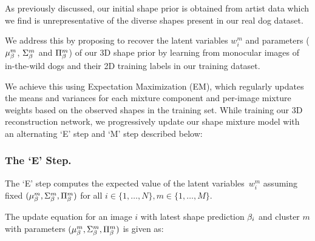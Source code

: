 As previously discussed, our initial shape prior is obtained from artist data which we find is unrepresentative of the diverse shapes present in our real dog dataset. 


We address this by proposing to recover the latent variables $w_{i}^{m}$ and parameters ($\mu_{\beta}^{m}$, $\Sigma_{\beta}^{m}$ and $\Pi_{\beta}^{m}$) of our 3D shape prior by learning from monocular images of in-the-wild dogs and their 2D training labels in our training dataset.

We achieve this using Expectation Maximization (EM), which regularly updates the means and variances for each mixture component and per-image mixture weights based on the observed shapes in the training set. While training our 3D reconstruction network, we progressively update our shape mixture model with an alternating `E' step and `M' step described below:

\subsubsection{The `E' Step.}
The `E' step computes the expected value of the latent variables~$w_{i}^{m}$ 
assuming fixed $(\mu_{\beta}^{m}, \Sigma_{\beta}^{m}, \Pi_{\beta}^{m})$ for all $i \in \{1,\dots,N\}, m \in \{1,\dots,M\}$.

The update equation for an image $i$ with latest shape prediction $\beta_{i}$ 
and cluster $m$ with parameters $(\mu_{\beta}^{m}, \Sigma_{\beta}^{m}, \Pi_{\beta}^{m})$ 
is given as:


